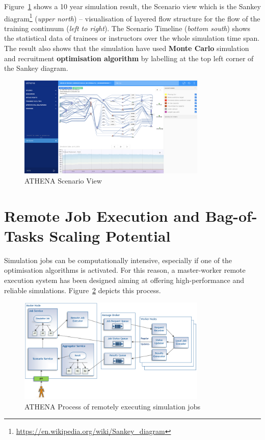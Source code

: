 Figure~\ref{fig:scenarioScreen} shows a 10 year simulation result, the Scenario view which is the Sankey diagram\footnote{\url{https://en.wikipedia.org/wiki/Sankey_diagram}} (\textit{upper north}) -- visualisation of layered flow structure for the flow of the training continuum (\textit{left to right}). The Scenario Timeline (\textit{bottom south}) shows the statistical data of trainees or instructors over the whole simulation time span. The result also shows that the simulation have used \textbf{Monte Carlo} simulation and recruitment \textbf{optimisation algorithm} by labelling at the top left corner of the Sankey diagram.

\begin{figure}
\centering
\includegraphics[width=0.8\textwidth]{Figures/ATHENA_scenario_screen}
\decoRule
\caption[ATHENA Scenario View]{ATHENA Scenario View}
\label{fig:scenarioScreen}
\end{figure}

\section{Remote Job Execution and Bag-of-Tasks Scaling Potential}

Simulation jobs can be computationally intensive, especially if one of the optimisation algorithms is activated. For this reason, a master-worker remote execution system has been designed aiming at offering high-performance and reliable simulations. Figure~\ref{fig:remoteJob} depicts this process.

\begin{figure}
\centering
\includegraphics[width=0.8\textwidth]{Figures/ATHENA_remote_job_exec}
\decoRule
\caption[ATHENA Remote Job Execution]{ATHENA Process of remotely executing simulation jobs}
\label{fig:remoteJob}
\end{figure}

